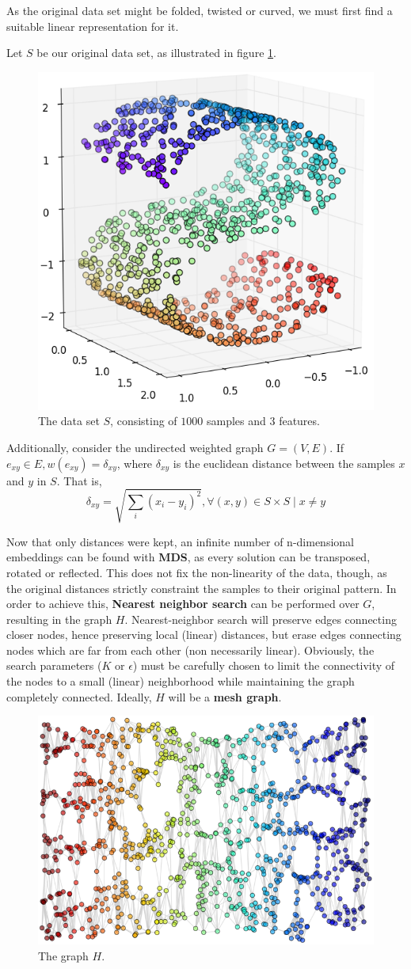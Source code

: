 \documentclass[12pt]{article}
\begin{document}
As the original data set might be folded, twisted or curved, \cite{ten2000} we must first find a suitable linear representation for it.

Let $S$ be our original data set, as illustrated in figure \ref{fig:mani_s}.

\begin{figure}[H]
	\centering
	\captionsetup{justification=centering}
	\includegraphics[width=.5\linewidth]{mani_s}
	\caption{The data set $S$, consisting of $1000$ samples and $3$ features.}
	\label{fig:mani_s}
\end{figure}

Additionally, consider the undirected weighted graph $G=(V, E)$. If $e_{xy} \in E, w(e_{xy}) = \delta_{xy}$, where $\delta_{xy}$ is the euclidean distance between the samples $x$ and $y$ in $S$. That is,
$$\delta_{xy} = \sqrt{\sum_{i} (x_i - y_i)^2}, \forall (x, y) \in S\times S \mid x\ne y$$

Now that only distances were kept, an infinite number of n-dimensional embeddings can be found with \textbf{MDS}, as every solution can be transposed, rotated or reflected. This does not fix the non-linearity of the data, though, as the original distances strictly constraint the samples to their original pattern. In order to achieve this, \textbf{Nearest neighbor search} can be performed over $G$, resulting in the graph $H$. Nearest-neighbor search will preserve edges connecting closer nodes, hence preserving local (linear) distances, but erase edges connecting nodes which are far from each other (non necessarily linear). Obviously, the search parameters ($K$ or $\epsilon$) must be carefully chosen to limit the connectivity of the nodes to a small (linear) neighborhood while maintaining the graph completely connected. Ideally, $H$ will be a \textbf{mesh graph}.

\begin{figure}[H]
	\centering
	\captionsetup{justification=centering}
	\includegraphics[width=.5\linewidth]{mani_s_3}
	\caption{The graph $H$.}
	\label{fig:mani_s_graph_h}
\end{figure}
\end{document}
